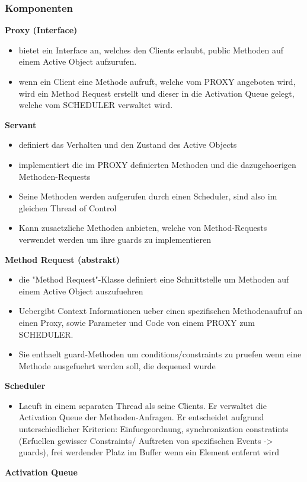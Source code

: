 \subsubsection{Komponenten}
\textbf{Proxy (Interface)}
\begin{itemize}
  \item bietet ein Interface an, welches den Clients erlaubt, public Methoden auf einem Active Object aufzurufen.
  \item wenn ein Client eine Methode aufruft, welche vom PROXY angeboten wird, wird ein Method Request erstellt und dieser in die Activation Queue gelegt, welche vom SCHEDULER verwaltet wird.
\end{itemize}
\textbf{Servant}
\begin{itemize}
  \item definiert das Verhalten und den Zustand des Active Objects
  \item implementiert die im PROXY definierten Methoden und die dazugehoerigen Methoden-Requests
  \item Seine Methoden werden aufgerufen durch einen Scheduler, sind also im gleichen Thread of Control
  \item Kann zusaetzliche Methoden anbieten, welche von Method-Requests verwendet werden um ihre guards zu implementieren
\end{itemize}
\textbf{Method Request (abstrakt)}
\begin{itemize}
  \item die "Method Request"-Klasse definiert eine Schnittstelle um Methoden auf einem Active Object auszufuehren
  \item Uebergibt Context Informationen ueber einen spezifischen Methodenaufruf an einen Proxy, sowie Parameter und Code von einem PROXY zum SCHEDULER.
  \item Sie enthaelt guard-Methoden um conditions/constraints zu pruefen wenn eine Methode ausgefuehrt werden soll, die dequeued wurde
\end{itemize}
\textbf{Scheduler}
\begin{itemize}
  \item Laeuft in einem separaten Thread als seine Clients. Er verwaltet die Activation Queue der Methoden-Anfragen. Er entscheidet aufgrund unterschiedlicher Kriterien: Einfuegeordnung, synchronization constratints (Erfuellen gewisser Constraints/ Auftreten von spezifischen Events -> guards), frei werdender Platz im Buffer wenn ein Element entfernt wird
\end{itemize}
\textbf{Activation Queue}
